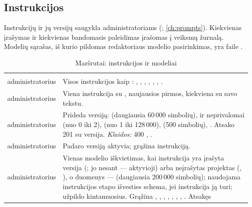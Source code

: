\subsection{Instrukcijos}\label{sec:api:prompts}

Instrukcijų ir jų versijų saugykla administratoriams (;
\cref{ch:prompts}). Kiekvienas įrašymas ir kiekvienas bandomasis paleidimas įrašomas į veiksmų
žurnalą. Modelių sąrašas, iš kurio pildomas redaktoriaus modelio pasirinkimas, yra faile
.

\begin{xltabular}{\textwidth}{@{}L{19mm}Y@{}}
\caption{Maršrutai: instrukcijos ir modeliai}\label{tab:api:prompts}\\
\toprule {} &  \\ \midrule \endfirsthead
\toprule {} &  \\ \midrule \endhead
\bottomrule \endlastfoot
{}
administratorius & Visos instrukcijos kaip : , , ,
  , , , . \\
\addlinespace
{}
administratorius & Viena instrukcija su , naujausios pirmos, kiekviena su savo
  tekstu. \\
\addlinespace
{}
administratorius & Prideda versiją:  (daugiausia 60\,000 simbolių),  ir
  neprivalomai  (nuo 0 iki 2),  (nuo 1 iki 128\,000),
   (500 simbolių), . Atsako 201 su versija. \emph{Klaidos:} 400
  , . \\
\addlinespace
{}
administratorius & Padaro versiją  aktyvia; grąžina instrukciją. \\
\addlinespace
{}
administratorius & Vienas modelio iškvietimas, kai instrukcija yra įrašyta versija
  (; jo nesant --- aktyvioji) arba neįrašytas projektas (,
  ), o duomenys ---  (daugiausia 200\,000 simbolių); naudojama
  instrukcijos etapo išvesties schema, jei instrukcija ją turi;  užpildo
  kintamuosius. Grąžina , , , ,
  , , , . Atsakęs

\end{xltabular}
